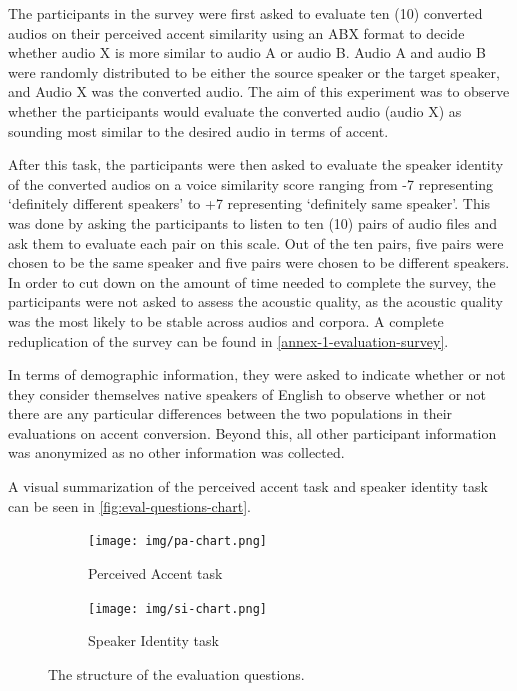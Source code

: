 \documentclass
[
    a4paper,
    twoside,
    12pt,
]
{report}
\begin{document}
The participants in the survey were first asked to evaluate ten (10)
converted audios on their perceived accent similarity using an ABX
format to decide whether audio X is more similar to audio A or audio B.
Audio A and audio B were randomly distributed to be either the source
speaker or the target speaker, and Audio X was the converted audio. The
aim of this experiment was to observe whether the participants would
evaluate the converted audio (audio X) as sounding most similar to the
desired audio in terms of accent.

After this task, the participants were then asked to evaluate the
speaker identity of the converted audios on a voice similarity score
ranging from -7 representing `definitely different speakers' to +7
representing `definitely same speaker'. This was done by asking the
participants to listen to ten (10) pairs of audio files and ask them to
evaluate each pair on this scale. Out of the ten pairs, five pairs were
chosen to be the same speaker and five pairs were chosen to be different
speakers. In order to cut down on the amount of time needed to complete
the survey, the participants were not asked to assess the acoustic
quality, as the acoustic quality was the most likely to be stable across
audios and corpora. A complete reduplication of the survey can be found
in \autoref{annex-1-evaluation-survey}.

In terms of demographic information, they were asked to indicate whether
or not they consider themselves native speakers of English to observe
whether or not there are any particular differences between the two
populations in their evaluations on accent conversion. Beyond this, all
other participant information was anonymized as no other information was
collected.

A visual summarization of the perceived accent task and speaker identity
task can be seen in \autoref{fig:eval-questions-chart}.

\begin{figure}[]
   \centering
   \begin{subfigure}[b]{0.4\textwidth}
      \texttt{[image: img/pa-chart.png]}
         \caption{Perceived Accent task}
         \label{fig:pa-chart}
   \end{subfigure}
   \quad
   \begin{subfigure}[b]{0.4\textwidth}
      \texttt{[image: img/si-chart.png]}
         \caption{Speaker Identity task}
         \label{fig:si-chart}
   \end{subfigure} 
   \quad
   \caption{The structure of the evaluation questions.}
   \label{fig:eval-questions-chart}
\end{figure}
\cleardoublepage
\end{document}
